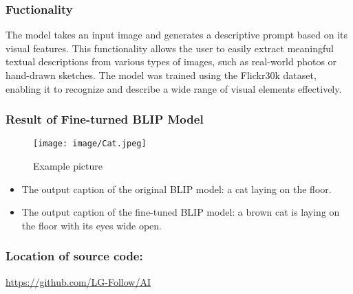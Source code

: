 \documentclass[conference]{IEEEtran}
\begin{document}
\subsubsection{Fuctionality}
\noindent The model takes an input image and generates a descriptive prompt based on its visual features. This functionality allows the user to easily extract meaningful textual descriptions from various types of images, such as real-world photos or hand-drawn sketches. The model was trained using the Flickr30k dataset, enabling it to recognize and describe a wide range of visual elements effectively.\\

\subsubsection{Result of Fine-turned BLIP Model}
\begin{figure}[h!]
    \centering
    \texttt{[image: image/Cat.jpeg]}
    \caption{Example picture}
    \label{fig:enter-label}
\end{figure}

\begin{itemize}
    \item The output caption of the original BLIP model: a cat laying on the floor.\\
    \item The output caption of the fine-tuned BLIP model: a brown cat is laying on the floor with its eyes wide open.\\
\end{itemize}


\subsubsection{Location of source code:}
\url{https://github.com/LG-Follow/AI}\\
\end{document}
